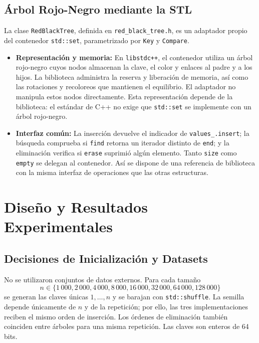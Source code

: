 \documentclass[11pt,letterpaper]{article}
\begin{document}
\subsection{Árbol Rojo-Negro mediante la STL}

La clase \texttt{RedBlackTree}, definida en \texttt{red\_black\_tree.h},
es un adaptador propio del contenedor \texttt{std::set}, parametrizado
por \texttt{Key} y \texttt{Compare}.

\begin{itemize}
    \item \textbf{Representación y memoria:}
    En \texttt{libstdc++}, el contenedor utiliza un árbol rojo-negro cuyos
    nodos almacenan la clave, el color y enlaces al padre y a los hijos.
    La biblioteca administra la reserva y liberación de memoria, así como
    las rotaciones y recoloreos que mantienen el equilibrio. El adaptador
    no manipula estos nodos directamente. Esta representación depende de
    la biblioteca: el estándar de C++ no exige que \texttt{std::set} se
    implemente con un árbol rojo-negro.

    \item \textbf{Interfaz común:}
    La inserción devuelve el indicador de \texttt{values\_.insert}; la
    búsqueda comprueba si \texttt{find} retorna un iterador distinto de
    \texttt{end}; y la eliminación verifica si \texttt{erase} suprimió
    algún elemento. Tanto \texttt{size} como \texttt{empty} se delegan
    al contenedor. Así se dispone de una referencia de biblioteca con la
    misma interfaz de operaciones que las otras estructuras.
\end{itemize}
\newpage

\section{Diseño y Resultados Experimentales}

\subsection{Decisiones de Inicialización y Datasets}

No se utilizaron conjuntos de datos externos. Para cada tamaño
\[
n\in\{1\,000,2\,000,4\,000,8\,000,16\,000,32\,000,64\,000,128\,000\}
\]
se generan las claves únicas $1,\ldots,n$ y se barajan con
\texttt{std::shuffle}. La semilla depende únicamente de $n$ y de la
repetición; por ello, las tres implementaciones reciben el mismo orden de
inserción. Los órdenes de eliminación también coinciden entre árboles para
una misma repetición. Las claves son enteros de 64 bits.
\end{document}
